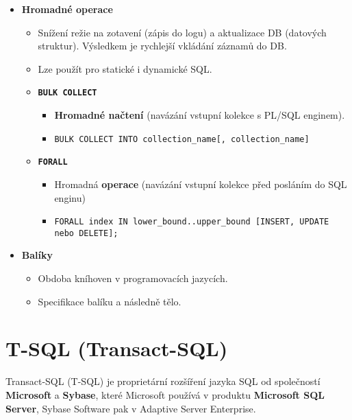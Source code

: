 \begin{itemize}
    \item\textbf{Hromadné operace}
          \begin{itemize}
              \item Snížení režie na zotavení (zápis do logu) a aktualizace DB (datových struktur). Výsledkem je rychlejší vkládání záznamů do DB.
              \item Lze použít pro statické i dynamické SQL.
              \item \textbf{\texttt{BULK COLLECT}}
                    \begin{itemize}
                        \item \textbf{Hromadné načtení} (navázání vstupní kolekce s PL/SQL enginem).
                        \item \texttt{BULK COLLECT INTO collection\_name[, collection\_name]}
                    \end{itemize}

              \item \textbf{\texttt{FORALL}}
                    \begin{itemize}
                        \item Hromadná \textbf{operace} (navázání vstupní kolekce před posláním do SQL enginu)
                        \item \texttt{FORALL index IN lower\_bound..upper\_bound [INSERT, UPDATE nebo DELETE];}
                    \end{itemize}
          \end{itemize}



    \item\textbf{Balíky}
          \begin{itemize}
              \item Obdoba kníhoven v programovacích jazycích.
              \item Specifikace balíku a následně tělo.
          \end{itemize}


\end{itemize}






\section{T-SQL (Transact-SQL)}
Transact-SQL (T-SQL) je proprietární rozšíření jazyka SQL od společností \textbf{Microsoft} a \textbf{Sybase}, které Microsoft používá v produktu \textbf{Microsoft SQL Server}, Sybase Software pak v Adaptive Server Enterprise.

